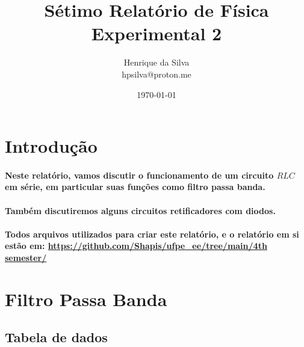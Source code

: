 \documentclass[12pt,twoside, a4paper, twocolumn]{article}
\title{Sétimo  Relatório de Física Experimental 2}
\author{Henrique da Silva \\ hpsilva@proton.me}
\date{\today}
\begin{document}
\maketitle
{}
\newpage
\tableofcontents
\newpage

\section{Introdução}

\paragraph*{Neste relatório, vamos discutir o funcionamento de um circuito $RLC$ em série, em particular suas funções como filtro passa banda.}

\paragraph*{Também discutiremos alguns circuitos retificadores com diodos.}

\paragraph*{Todos arquivos utilizados para criar este relatório, e o relatório em si estão em:  \url{https://github.com/Shapis/ufpe_ee/tree/main/4th semester/}}


\section{Filtro Passa Banda}

\subsection{Tabela de dados}
\end{document}
